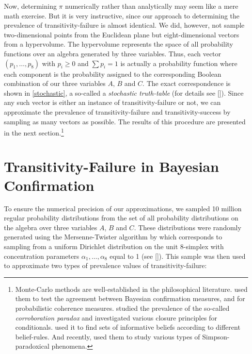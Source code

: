 \documentclass[a4paper,11pt]{article}
\begin{document}
Now, determining $\pi$ numerically rather than analytically may seem like a mere math exercise. But it is very instructive, since our approach to determining the prevalence of transitivity-failure is almost identical. We did, however, not sample two-dimensional points from the Euclidean plane but eight-dimensional vectors from a hypervolume. The hypervolume represents the space of all probability functions over an algebra generated by three variables. Thus, each vector $(p_1,\ldots,p_8)$ with $p_i\geq 0$ and $\sum p_i=1$ is actually a probability function where each component is the probability assigned to the corresponding Boolean combination of our three variables $A$, $B$ and $C$. The exact correspondence is shown in \autoref{stochastic}, a so-called a \emph{stochastic truth-table} (for details see \citeauthor{Fitelson2008} [\citeyear{Fitelson2008}]). Since any such vector is either an instance of transitivity-failure or not, we can approximate the prevalence of transitivity-failure and transitivity-success by sampling as many vectors as possible. The results of this procedure are presented in the next section.\footnote{Monte-Carlo methods are well-established in the philosophical literature. \cite{Tentori2007} used them to test the agreement between Bayesian confirmation measures, \cite{Angere2007,Angere2008} and \cite{Koscholkeetal2018} for probabilistic coherence measures. \cite{Wagner2013} studied the prevalence of the so-called \emph{corroboration paradox} and \cite{Douven2015} investigated various closure principles for conditionals. \cite{Douven2018} used it to find sets of informative beliefs according to different belief-rules. And recently, \cite{Fitelson2021} used them to study various types of Simpson-paradoxical phenomena.}


\section{Transitivity-Failure in Bayesian Confirmation}
\label{sec3}

To ensure the numerical precision of our approximations, we sampled 10 million regular probability distributions from the set of all probability distributions on the algebra over three variables $A$, $B$ and $C$. These distributions were randomly generated using the Mersenne-Twister algorithm by \cite{Matsumoto1998} which corresponds to sampling from a uniform Dirichlet distribution on the unit 8-simplex with concentration parameters $\alpha_1,\ldots,\alpha_8$ equal to 1 (see \citeauthor{Kotz2000} [\citeyear{Kotz2000}]). This sample was then used to approximate two types of prevalence values of transitivity-failure:
\end{document}
